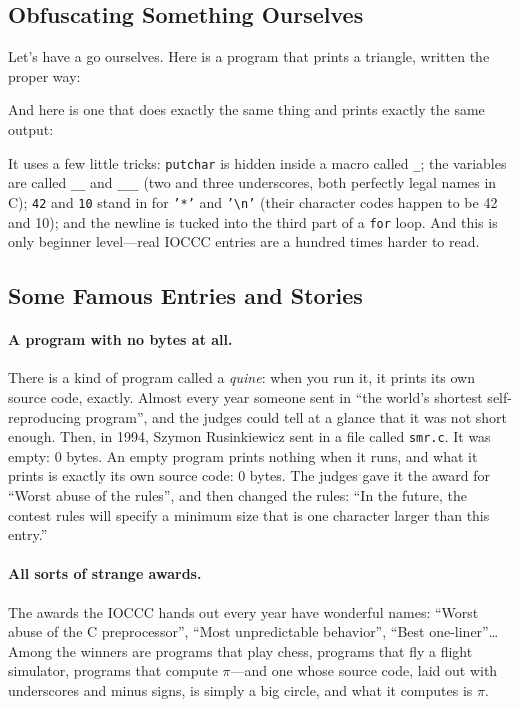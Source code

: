 \subsection{Obfuscating Something Ourselves}

Let's have a go ourselves. Here is a program that prints a triangle, written the proper way:


And here is one that does exactly the same thing and prints exactly the same output:


It uses a few little tricks: \texttt{putchar} is hidden inside a macro called \texttt{\_}; the variables are called \texttt{\_\_} and \texttt{\_\_\_} (two and three underscores, both perfectly legal names in C); \texttt{42} and \texttt{10} stand in for \texttt{'*'} and \texttt{'\textbackslash n'} (their character codes happen to be 42 and 10); and the newline is tucked into the third part of a \texttt{for} loop. And this is only beginner level---real IOCCC entries are a hundred times harder to read.

\subsection{Some Famous Entries and Stories}

\paragraph{A program with no bytes at all.}
There is a kind of program called a \emph{quine}: when you run it, it prints its own source code, exactly. Almost every year someone sent in ``the world's shortest self-reproducing program'', and the judges could tell at a glance that it was not short enough. Then, in 1994, Szymon Rusinkiewicz sent in a file called \texttt{smr.c}. It was empty: 0 bytes. An empty program prints nothing when it runs, and what it prints is exactly its own source code: 0 bytes. The judges gave it the award for ``Worst abuse of the rules'', and then changed the rules: ``In the future, the contest rules will specify a minimum size that is one character larger than this entry.''

\paragraph{All sorts of strange awards.}
The awards the IOCCC hands out every year have wonderful names: ``Worst abuse of the C preprocessor'', ``Most unpredictable behavior'', ``Best one-liner''\ldots{} Among the winners are programs that play chess, programs that fly a flight simulator, programs that compute $\pi$---and one whose source code, laid out with underscores and minus signs, is simply a big circle, and what it computes is $\pi$.

